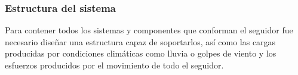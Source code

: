 %

\subsubsection{Estructura del sistema}
Para contener todos los sistemas y componentes que conforman el seguidor fue necesario diseñar una estructura capaz de soportarlos, así como las cargas producidas por condiciones climáticas como lluvia o golpes de viento y los esfuerzos producidos por el movimiento de todo el seguidor.\\

